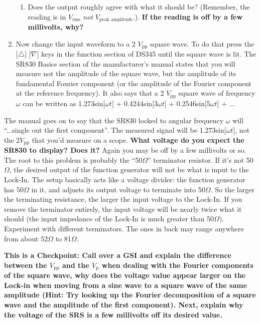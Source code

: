\documentclass{../lab}
\begin{document}
\begin{enumerate}
\begin{enumerate}
        \item Does the output roughly agree with what it should be? (Remember, the reading is in $V_\text{rms}$ \emph{not} $V_\text{peak amplitude}$.). \textbf{If the reading is off by a few millivolts, why?}

    \end{enumerate}

    \item Now change the input waveform to a 2 $V_\text{pp}$ square wave. To do that press the [$\triangle$] [$\nabla$] keys in the function section of DS345 until the square wave is lit. The SR830 Basics section of the manufacturer's manual states that you will measure not the amplitude of the square wave, but the amplitude of its fundamental Fourier component (or the amplitude of the Fourier component at the reference frequency). It also says that a 2 $V_\text{pp}$ square wave of frequency $\omega$ can be written as 1.273sin[$\omega t$] + 0.4244sin[3$\omega t$] + 0.2546sin[5$\omega t$] + ...

\end{enumerate}

The manual goes on to say that the SR830 locked to angular frequency $\omega$ will ``...single out the first component''. The measured signal will be 1.273sin[$\omega t$], not the 2$V_\text{pp}$ that you'd measure on a scope. \textbf{What voltage do you expect the SR830 to display? Does it?} Again you may be off by a few millivolts or so. The root to this problem is probably the ``50$\Omega$'' terminator resistor. If it's not 50$\Omega$, the desired output of the function generator will not be what is input to the Lock-In. The setup basically acts like a voltage divider: the function generator has 50$\Omega$ in it, and adjusts its output voltage to terminate into 50$\Omega$. So the larger the terminating resistance, the larger the input voltage to the Lock-In. If you remove the terminator entirely, the input voltage will be nearly twice what it should (the input impedance of the Lock-In is much greater than 50$\Omega$). Experiment with different terminators. The ones in back may range anywhere from about 52$\Omega$ to 81$\Omega$.


\textbf{This is a Checkpoint: Call over a GSI and explain the difference between the $V_\text{pp}$ and the $V_\text{p}$ when dealing with the Fourier components of the square wave, why does the voltage value appear larger on the Lock-in when moving from a sine wave to a square wave of the same amplitude (Hint: Try looking up the Fourier decomposition of a square wave and the amplitude of the first component). Next, explain why the voltage of the SRS is a few millivolts off its desired value. }
\end{document}

